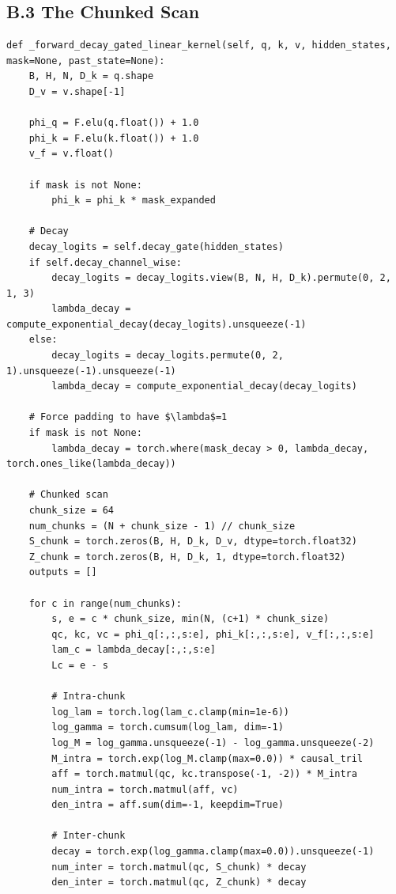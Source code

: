 \subsection{B.3 The Chunked Scan}

\begin{lstlisting}
def _forward_decay_gated_linear_kernel(self, q, k, v, hidden_states, mask=None, past_state=None):
    B, H, N, D_k = q.shape
    D_v = v.shape[-1]
    
    phi_q = F.elu(q.float()) + 1.0
    phi_k = F.elu(k.float()) + 1.0
    v_f = v.float()
    
    if mask is not None:
        phi_k = phi_k * mask_expanded
    
    # Decay
    decay_logits = self.decay_gate(hidden_states)
    if self.decay_channel_wise:
        decay_logits = decay_logits.view(B, N, H, D_k).permute(0, 2, 1, 3)
        lambda_decay = compute_exponential_decay(decay_logits).unsqueeze(-1)
    else:
        decay_logits = decay_logits.permute(0, 2, 1).unsqueeze(-1).unsqueeze(-1)
        lambda_decay = compute_exponential_decay(decay_logits)
    
    # Force padding to have $\lambda$=1
    if mask is not None:
        lambda_decay = torch.where(mask_decay > 0, lambda_decay, torch.ones_like(lambda_decay))
    
    # Chunked scan
    chunk_size = 64
    num_chunks = (N + chunk_size - 1) // chunk_size
    S_chunk = torch.zeros(B, H, D_k, D_v, dtype=torch.float32)
    Z_chunk = torch.zeros(B, H, D_k, 1, dtype=torch.float32)
    outputs = []
    
    for c in range(num_chunks):
        s, e = c * chunk_size, min(N, (c+1) * chunk_size)
        qc, kc, vc = phi_q[:,:,s:e], phi_k[:,:,s:e], v_f[:,:,s:e]
        lam_c = lambda_decay[:,:,s:e]
        Lc = e - s
        
        # Intra-chunk
        log_lam = torch.log(lam_c.clamp(min=1e-6))
        log_gamma = torch.cumsum(log_lam, dim=-1)
        log_M = log_gamma.unsqueeze(-1) - log_gamma.unsqueeze(-2)
        M_intra = torch.exp(log_M.clamp(max=0.0)) * causal_tril
        aff = torch.matmul(qc, kc.transpose(-1, -2)) * M_intra
        num_intra = torch.matmul(aff, vc)
        den_intra = aff.sum(dim=-1, keepdim=True)
        
        # Inter-chunk
        decay = torch.exp(log_gamma.clamp(max=0.0)).unsqueeze(-1)
        num_inter = torch.matmul(qc, S_chunk) * decay
        den_inter = torch.matmul(qc, Z_chunk) * decay
        

\end{lstlisting}
